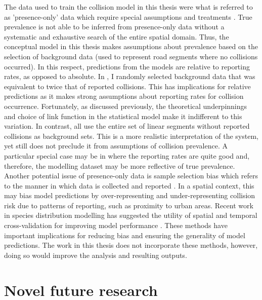 The data used to train the collision model in this thesis were what is referred to as 'presence-only' data which require special assumptions and treatments \citep{hast13,wart13}. True prevalence is not able to be inferred from presence-only data without a systematic and exhaustive search of the entire spatial domain. Thus, the conceptual model in this thesis makes assumptions about prevalence based on the selection of background data (used to represent road segments where no collisions occurred). In this respect, predictions from the models are relative to reporting rates, as opposed to absolute.  In , I randomly selected background data that was equivalent to twice that of reported collisions. This has implications for relative predictions as it makes strong assumptions about reporting rates for collision occurrence. Fortunately, as discussed previously, the theoretical underpinnings and choice of link function in the statistical model make it indifferent to this variation. In contrast,  all use the entire set of linear segments without reported collisions as background sets. This is a more realistic interpretation of the system, yet still does not preclude it from assumptions of collision prevalence. A particular special case may be in  where the reporting rates are quite good and, therefore, the modelling dataset may be more reflective of true prevalence. Another potential issue of presence-only data is sample selection bias which refers to the manner in which data is collected and reported \citep{phil09}. In a spatial context, this may bias model predictions by over-representing and under-representing collision risk due to patterns of reporting, such as proximity to urban areas. Recent work in species distribution modelling has suggested the utility of spatial and temporal cross-validation for improving model performance \citep{weng12,robe17}. These methods have important implications for reducing bias and ensuring the generality of model predictions. The work in this thesis does not incorporate these methods, however, doing so would improve the analysis and resulting outputs.

\section{Novel future research}

